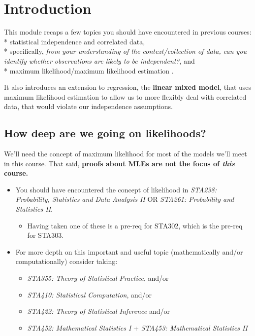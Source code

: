 \documentclass[
  openany]{book}
\providecommand{\tightlist}{%
  \setlength{\itemsep}{0pt}\setlength{\parskip}{0pt}}
\begin{document}
\hypertarget{introduction-3}{%
\section{Introduction}\label{introduction-3}}

This module recaps a few topics you should have encountered in previous courses:
* statistical independence and correlated data,\\
* specifically, \emph{from your understanding of the context/collection of data, can you identify whether observations are likely to be independent?}, and\\
* maximum likelihood/maximum likelihood estimation .

It also introduces an extension to regression, the \textbf{linear mixed model}, that uses maximum likelihood estimation to allow us to more flexibly deal with correlated data, that would violate our independence assumptions.

\hypertarget{how-deep-are-we-going-on-likelihoods}{%
\subsection{How deep are we going on likelihoods?}\label{how-deep-are-we-going-on-likelihoods}}

We'll need the concept of maximum likelihood for most of the models we'll meet in this course. That said, \textbf{proofs about MLEs are not the focus of \emph{this} course.}

\begin{itemize}
\tightlist
\item
  You should have encountered the concept of likelihood in \emph{STA238: Probability, Statistics and Data Analysis II} OR \emph{STA261: Probability and Statistics II}.

  \begin{itemize}
  \tightlist
  \item
    Having taken one of these is a pre-req for STA302, which is the pre-req for STA303.
  \end{itemize}
\item
  For more depth on this important and useful topic (mathematically and/or computationally) consider taking:

  \begin{itemize}
  \tightlist
  \item
    \emph{STA355: Theory of Statistical Practice}, and/or
  \item
    \emph{STA410: Statistical Computation}, and/or
  \item
    \emph{STA422: Theory of Statistical Inference} and/or
  \item
    \emph{STA452: Mathematical Statistics I} + \emph{STA453: Mathematical Statistics II}
  \end{itemize}
\end{itemize}
\end{document}
